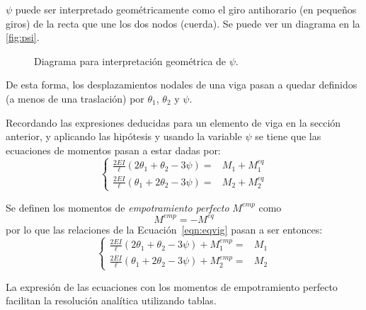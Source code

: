 $\psi$ puede ser interpretado geométricamente como el giro antihorario (en pequeños giros) de la recta que une los dos nodos (cuerda). Se puede ver un diagrama en la \autoref{fig:psi}.

\begin{figure}[htb]
	\centering
	\def\svgwidth{0.55\textwidth}
	
	\caption{Diagrama para interpretación geométrica de $\psi$.}
	\label{fig:psi}
\end{figure}

De esta forma, los desplazamientos nodales de una viga pasan a quedar definidos (a menos de una traslación) por $\theta_1$, $\theta_{2}$ y $\psi$.

Recordando las expresiones deducidas para un elemento de viga en la sección anterior, y aplicando las hipótesis y usando la variable $\psi$ se tiene que las ecuaciones de momentos pasan a estar dadas por: %
%
\begin{equation}\label{eqn:eqvig}
\left\{
\begin{array}{rl}
\displaystyle
\frac{2 EI}{\ell} \left( 2 \theta_1  + \theta_2 - 3 \psi   \right) =& M_1  + M_1^{eq}\\[3mm]
\displaystyle
\frac{2 EI}{\ell} \left( \theta_1 + 2  \theta_2 - 3 \psi  \right) =& M_2 + M_2^{eq}
\end{array}
\right.
\end{equation}


Se definen los momentos de \textit{empotramiento perfecto} $M^{emp}$ como 
$$
\boxed{
M^{emp} = -M^{eq}
}
$$
por lo que las relaciones de la Ecuación~\eqref{eqn:eqvig} pasan a ser entonces:
%
\begin{equation}\label{eqn:ecmomtr}
	\boxed{
		\left\{
		\begin{array}{rl}
			\displaystyle
			\frac{2 EI}{\ell} \left( 2 \theta_1  + \theta_2 - 3 \psi   \right) + M_1^{emp} =& M_1  \\[3mm]
			\displaystyle
			\frac{2 EI}{\ell} \left( \theta_1 + 2  \theta_2 - 3 \psi  \right) + M_2^{emp} =& M_2 
		\end{array}
		\right.
	}
\end{equation}



La expresión de las ecuaciones con los momentos de empotramiento perfecto facilitan la resolución analítica utilizando tablas.

